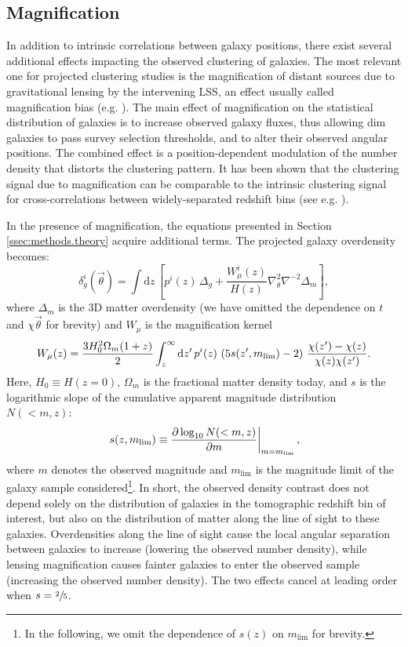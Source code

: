 \documentclass[a4paper,11pt]{article}
\newcommand{\nv}{\vec{\theta}}
\begin{document}
  \subsection{Magnification}\label{ssec:results.magnification}
    In addition to intrinsic correlations between galaxy positions, there exist several additional effects impacting the observed clustering of galaxies. The most relevant one for projected clustering studies is the magnification of distant sources due to gravitational lensing by the intervening LSS, an effect usually called magnification bias (e.g. \cite{Schneider:1989, Narayan:1989}). The main effect of magnification on the statistical distribution of galaxies is to increase observed galaxy fluxes, thus allowing dim galaxies to pass survey selection thresholds, and to alter their observed angular positions. The combined effect is a position-dependent modulation of the number density that distorts the clustering pattern. It has been shown that the clustering signal due to magnification can be comparable to the intrinsic clustering signal for cross-correlations between widely-separated redshift bins (see e.g. \cite{Challinor:2011}).

    In the presence of magnification, the equations presented in Section \ref{ssec:methods.theory} acquire additional terms. The projected galaxy overdensity becomes:
    \begin{equation}
      \delta^i_g(\nv)=\int \mathrm{d}z\,\left[p^i(z)\,\Delta_g+\frac{W_\mu^i(z)}{H(z)}\nabla_\theta^2\nabla^{-2}\Delta_m\right],
    \end{equation}
    where $\Delta_m$ is the 3D matter overdensity (we have omitted the dependence on $t$ and $\chi\nv$ for brevity) and $W_\mu$ is the magnification kernel
    \begin{equation}
      W_\mu(z)=\frac{3H_0^2\Omega_{m}(1+z)}{2}\int_z^\infty \mathrm{d}z'\,p^i(z)\,\left(5s(z',m_{\rm lim})-2\right)\,\frac{\chi(z')-\chi(z)}{\chi(z)\chi(z')}.
    \end{equation}
    Here, $H_0\equiv H(z=0)$, $\Omega_{m}$ is the fractional matter density today, and $s$ is the logarithmic slope of the cumulative apparent magnitude distribution $N(<m, z)$:
    \begin{equation}
      \left. s(z,m_{\rm lim}) \equiv \frac{\partial \log_{10}N(<m, z)}{\partial m}\right \rvert_{m=m_{\mathrm{lim}}},
      \label{eq:s-func}
    \end{equation}
    where $m$ denotes the observed magnitude and $m_{\mathrm{lim}}$ is the magnitude limit of the galaxy sample considered\footnote{In the following, we omit the dependence of $s(z)$ on $m_{\mathrm{lim}}$ for brevity.}. In short, the observed density contrast does not depend solely on the distribution of galaxies in the tomographic redshift bin of interest, but also on the distribution of matter along the line of sight to these galaxies. Overdensities along the line of sight cause the local angular separation between galaxies to increase (lowering the observed number density), while lensing magnification causes fainter galaxies to enter the observed sample (increasing the observed number density). The two effects cancel at leading order when $s=\sfrac{2}{5}$. 
\end{document}
